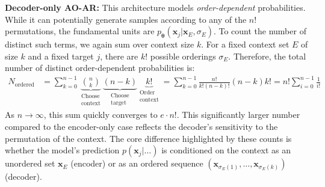 \textbf{Decoder-only AO-AR:} This architecture models \textit{order-dependent} probabilities. While it can potentially generate samples according to any of the $n!$ permutations, the fundamental units are $p_{\boldsymbol{\theta}}(\boldsymbol{x}_j | \boldsymbol{x}_{E}, \sigma_{E})$. To count the number of distinct such terms, we again sum over context size $k$. For a fixed context set $E$ of size $k$ and a fixed target $j$, there are $k!$ possible orderings $\sigma_E$. Therefore, the total number of distinct order-dependent probabilities is:
\begin{align}
N_{\text{ordered}} &= \sum_{k=0}^{n-1} \underbrace{\binom{n}{k}}_{\substack{\text{Choose} \\ \text{context}}} \underbrace{(n-k)}_{\substack{\text{Choose} \\ \text{target}}} \underbrace{k!}_{\substack{\text{Order} \\ \text{context}}} = \sum_{k=0}^{n-1} \frac{n!}{k!(n-k)!} (n-k) k! = n! \sum_{i=0}^{n-1} \frac{1}{i!}\label{eq:decoder_count_sum}
\end{align}
As $n \to \infty$, this sum quickly converges to $e \cdot n!$. This significantly larger number compared to the encoder-only case reflects the decoder's sensitivity to the permutation of the context. The core difference highlighted by these counts is whether the model's prediction $p(\boldsymbol{x}_j | \dots)$ is conditioned on the context as an unordered set $\boldsymbol{x}_E$ (encoder) or as an ordered sequence $(\boldsymbol{x}_{\sigma_E(1)}, \dots, \boldsymbol{x}_{\sigma_E(k)})$ (decoder).
